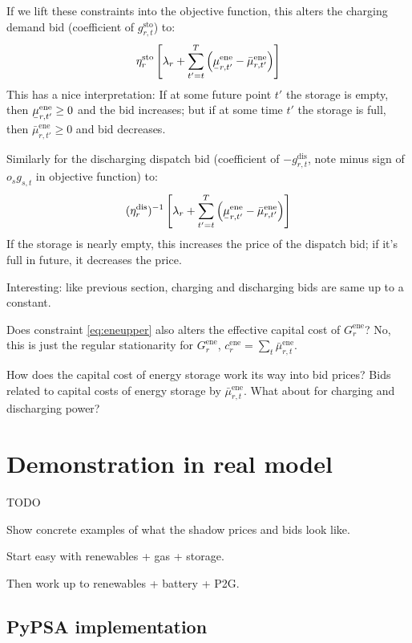 \documentclass[final,3p,times]{elsarticle}
\def\l{\lambda} \def\K{\kappa} \def\m{\mu} \def\G{\Gamma} \def\d{\partial}
\begin{document}
If we lift these constraints into the objective function, this alters the
charging demand bid (coefficient of  $g^{\textrm{sto}}_{r,t}$) to:
\begin{equation}
  \eta^{\textrm{sto}}_r \left[ \l_r + \sum_{t'=t}^T \left( \ubar{\mu}^{\textrm{ene}}_{r,t'} -\bar{\mu}^{\textrm{ene}}_{r,t'}  \right) \right]
\end{equation}
This has a nice interpretation: If at some future point $t'$ the storage is
empty, then $\ubar{\mu}^{\textrm{ene}}_{r,t'} \geq 0$  and the bid increases;
but if at some time $t'$ the storage is full, then
$\bar{\mu}^{\textrm{ene}}_{r,t'} \geq 0$ and bid decreases.

Similarly for the discharging dispatch bid (coefficient of
$-g^{\textrm{dis}}_{r,t}$, note minus sign of $o_sg_{s,t}$ in objective
function) to:
\begin{equation}
  (\eta^{\textrm{dis}}_r)^{-1}\left[ \l_r + \sum_{t'=t}^T \left(\ubar{\mu}^{\textrm{ene}}_{r,t'} - \bar{\mu}^{\textrm{ene}}_{r,t'}  \right)\right]
\end{equation}
If the storage is nearly empty, this increases the price of the dispatch bid; if
it's full in future, it decreases the price.

Interesting: like previous section, charging and discharging bids are same up to
a constant.

Does constraint \eqref{eq:eneupper} also alters the effective capital cost of
$G^{\textrm{ene}}_r$? No, this is just the regular stationarity for
$G^{\textrm{ene}}_r$, $ c^{\textrm{ene}}_r = \sum_t
\bar{\mu}^{\textrm{ene}}_{r,t}$.

How does the capital cost of energy storage work its way into bid prices? Bids
related to capital costs of energy storage by $\bar{\mu}^{\textrm{ene}}_{r,t}$.
What about for charging and discharging power?


\section{Demonstration in real model}

TODO

Show concrete examples of what the shadow prices and bids look like.

Start easy with renewables + gas + storage.

Then work up to renewables + battery + P2G.


\subsection{PyPSA implementation}
\end{document}

